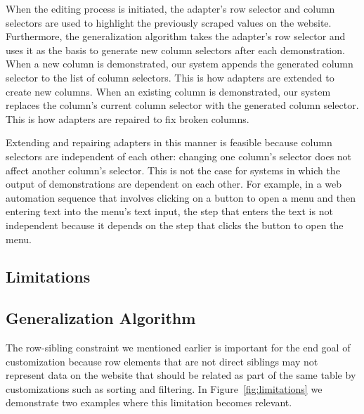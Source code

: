 \documentclass[sigconf,10pt]{acmart}
\begin{document}
When the editing process is initiated, the adapter's row selector and
column selectors are used to highlight the previously scraped values on
the website. Furthermore, the generalization algorithm takes the
adapter's row selector and uses it as the basis to generate new column
selectors after each demonstration. When a new column is demonstrated,
our system appends the generated column selector to the list of column
selectors. This is how adapters are extended to create new columns. When
an existing column is demonstrated, our system replaces the column's
current column selector with the generated column selector. This is how
adapters are repaired to fix broken columns.

Extending and repairing adapters in this manner is feasible because
column selectors are independent of each other: changing one column's
selector does not affect another column's selector. This is not the case
for systems in which the output of demonstrations are dependent on each
other. For example, in a web automation sequence that involves clicking
on a button to open a menu and then entering text into the menu's text
input, the step that enters the text is not independent because it
depends on the step that clicks the button to open the menu.

\hypertarget{limitations}{%
\subsection{Limitations}\label{limitations}}

\hypertarget{generalization-algorithm}{%
\subsection{Generalization Algorithm}\label{generalization-algorithm}}

The row-sibling constraint we mentioned earlier is important for the end
goal of customization because row elements that are not direct siblings
may not represent data on the website that should be related as part of
the same table by customizations such as sorting and filtering. In
Figure~\ref{fig:limitations} we demonstrate two examples where this
limitation becomes relevant.
\end{document}
